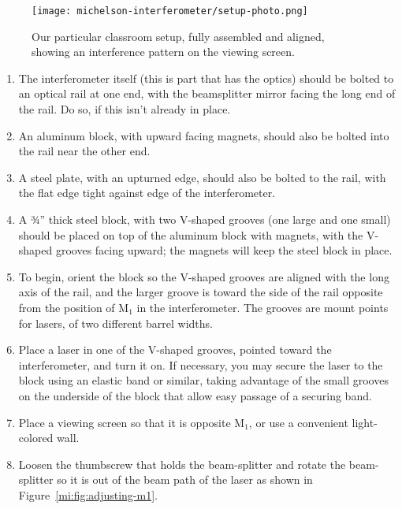 \begin{figure}
	\centering
	\texttt{[image: michelson-interferometer/setup-photo.png]}
	\caption{Our particular classroom setup, fully assembled and aligned, showing an interference pattern on the viewing screen.}\label{mi:fig:setup-photo}
\end{figure}

\begin{enumerate}
	\item The interferometer itself (this is part that has the optics) should be bolted to an optical rail at one end, with the
beamsplitter mirror facing the long end of the rail. Do so, if this isn't already in place.

	\item An aluminum block, with upward
facing magnets, should also be bolted into the rail near the other end.

	\item A steel plate, with an upturned edge, should
also be bolted to the rail, with the flat edge tight against edge of the interferometer.

	\item A 3⁄4” thick steel block, with two V-shaped grooves (one large and one small) should be placed on top of the aluminum block with magnets, with the V-shaped grooves facing upward; the magnets will keep the steel block in place.
	
	\item To begin, orient the block so the V-shaped grooves are aligned with the long axis of the rail, and the larger groove is toward the side of the rail opposite from the position of M$_1$ in the interferometer. The grooves are mount points for lasers, of two different barrel widths.
	
	\item Place a laser in one of the V-shaped grooves, pointed toward the interferometer, and turn it on. If necessary, you may secure the laser to the block using an elastic band or similar, taking advantage of the small grooves on the underside of the block that allow easy passage of a securing band.
	
	\item Place a viewing screen so that it is opposite M$_1$, or use a convenient light-colored wall.
	
	\item Loosen the thumbscrew that holds the beam-splitter and rotate the beam-splitter so it is out of the beam path of the
	laser as shown in Figure~\ref{mi:fig:adjusting-m1}.
	

\end{enumerate}
